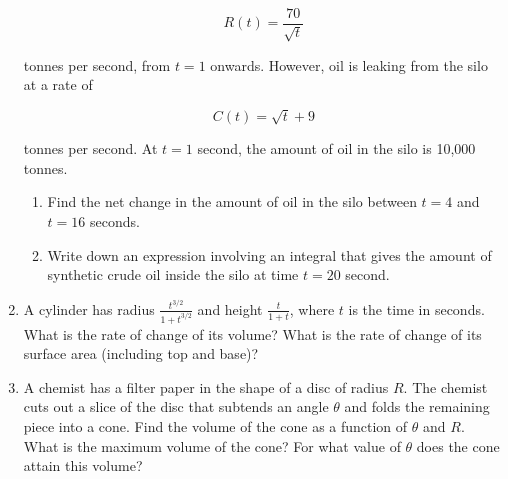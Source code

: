 \documentclass[letterpaper]{article}
\begin{document}
\begin{enumerate}
$$
R(t) = \frac{70}{\sqrt{t}}
$$

tonnes per second, from $t=1$ onwards. However, oil is leaking from the silo at a rate of

$$
C(t) = \sqrt{t} + 9
$$

tonnes per second. At $t=1$ second, the amount of oil in the silo is 10,000 tonnes.

\begin{enumerate}
\item Find the net change in the amount of oil in the silo between $t=4$ and $t=16$ seconds.
\item Write down an expression involving an integral that gives the amount of synthetic crude oil inside the silo at time $t=20$ second.
\end{enumerate}

\item A cylinder has radius $\frac{t^{3/2}}{1+t^{3/2}}$ and height $\frac{t}{1+t}$, where $t$ is the time in seconds. What is the rate of change of its volume? What is the rate of change of its surface area (including top and base)?

\item A chemist has a filter paper in the shape of a disc of radius $R$. The chemist cuts out a slice of the disc that subtends an angle $\theta$ and folds the remaining piece into a cone. Find the volume of the cone as a function of $\theta$ and $R$. What is the maximum volume of the cone? For what value of $\theta$ does the cone attain this volume?

\end{enumerate}
\end{document}
